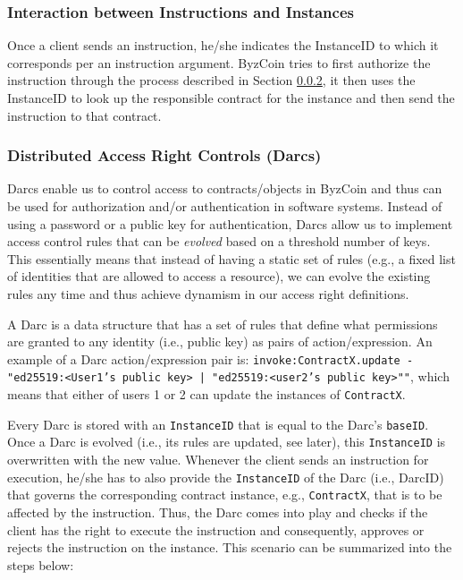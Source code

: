 \subsubsection{Interaction between Instructions and Instances}
Once a client sends an instruction, he/she indicates the InstanceID to which it corresponds per an instruction argument. ByzCoin tries to first authorize the instruction through the process described in Section \ref{background:darc}, it then uses the InstanceID to look up the responsible contract for the instance and then send the instruction to that contract. 


\subsubsection{Distributed Access Right Controls (Darcs)}\label{background:darc}

Darcs enable us to control access to contracts/objects in ByzCoin and thus can be used for authorization and/or authentication in software systems. Instead of using a password or a public key for authentication, Darcs allow us to implement access control rules that can be \textit{evolved} based on a threshold number of keys. This essentially means that instead of having a static set of rules (e.g., a fixed list of identities that are allowed to access a resource), we can evolve the existing rules any time and thus achieve dynamism in our access right definitions.  

A Darc is a data structure that has a set of rules that define what permissions are granted to any identity (i.e., public key) as pairs of action/expression. An example of a Darc action/expression pair is: \texttt{invoke:ContractX.update - "ed25519:<User1's public key> | "ed25519:<user2's public key>""}, which means that either of users 1 or 2 can update the instances of \texttt{ContractX}. 

Every Darc is stored with an \texttt{InstanceID} that is equal to the Darc's \texttt{baseID}. Once a Darc is evolved (i.e., its rules are updated, see later), this \texttt{InstanceID} is overwritten with the new value. Whenever the client sends an instruction for execution, he/she has to also provide the \texttt{InstanceID} of the Darc (i.e., DarcID) that governs the corresponding contract instance, e.g., \texttt{ContractX}, that is to be affected by the instruction. Thus, the Darc comes into play and checks if the client has the right to execute the instruction and consequently, approves or rejects the instruction on the instance. This scenario can be summarized into the steps below:

